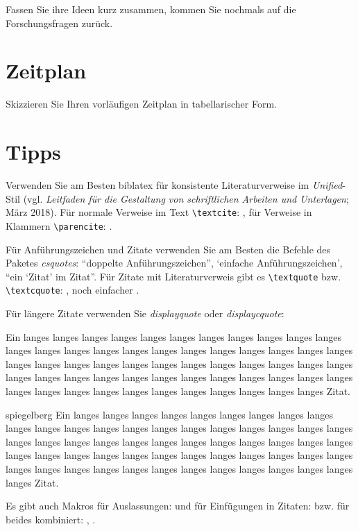 \documentclass[naustrian]{univie-ling-expose}
\begin{document}
Fassen Sie ihre Ideen kurz zusammen, kommen Sie nochmals auf die Forschungsfragen zurück.


\section{Zeitplan}\label{sec:zeitplan}

Skizzieren Sie Ihren vorläufigen Zeitplan in tabellarischer Form.


\section{Tipps}

Verwenden Sie am Besten \textsf{biblatex} für konsistente Literaturverweise im \emph{Unified}-Stil
(vgl. \emph{Leitfaden für die Gestaltung von schriftlichen Arbeiten und Unterlagen}; März 2018).
Für normale Verweise im Text \verb|\textcite|: \textcite[22]{brandt}, für Verweise in Klammern \verb|\parencite|: \parencite{brandt}.

Für Anführungszeichen und Zitate verwenden Sie am Besten die Befehle des Paketes \emph{csquotes}: \enquote{doppelte Anführungszeichen},
\enquote*{einfache Anführungszeichen}, \enquote{ein \enquote{Zitat} im Zitat}. Für Zitate mit Literaturverweis gibt es 
\verb|\textquote| bzw. \verb|\textcquote|: , noch einfacher 
.

Für längere Zitate verwenden Sie \emph{displayquote} oder \emph{displaycquote}:

\begin{displayquote}
	Ein langes langes langes langes langes langes langes langes langes langes langes langes langes langes langes langes langes langes
	langes langes langes langes langes langes langes langes langes langes langes langes langes langes langes langes langes langes langes langes
	langes langes langes langes langes langes langes langes langes langes langes langes langes langes langes langes langes langes langes langes
	Zitat.
\end{displayquote}

\begin{displaycquote}[202]{spiegelberg}
	Ein langes langes langes langes langes langes langes langes langes langes langes langes langes langes langes langes langes langes
	langes langes langes langes langes langes langes langes langes langes langes langes langes langes langes langes langes langes langes langes
	langes langes langes langes langes langes langes langes langes langes langes langes langes langes langes langes langes langes langes langes
	Zitat.
\end{displaycquote}
%
Es gibt auch Makros für Auslassungen: \textelp{} und für Einfügungen in Zitaten:  bzw. für beides kombiniert: , .
\end{document}
